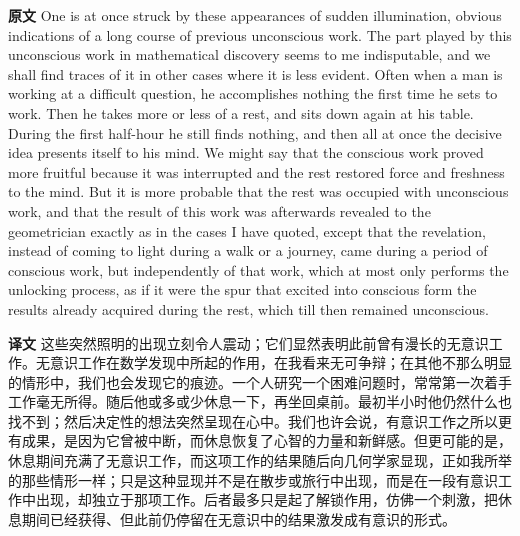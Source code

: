 \documentclass[UTF8]{ctexart}
\newenvironment{english}{\par\small\noindent\textbf{原文}\quad\ignorespaces}{\par}
\newenvironment{zhtranslation}{\par\noindent\textbf{译文}\quad\ignorespaces}{\par\vspace{0.35em}}
\begin{document}
\begin{english}
One is at once struck by these appearances of sudden illumination, obvious indications of a long course of previous unconscious work. The part played by this unconscious work in mathematical discovery seems to me indisputable, and we shall find traces of it in other cases where it is less evident. Often when a man is working at a difficult question, he accomplishes nothing the first time he sets to work. Then he takes more or less of a rest, and sits down again at his table. During the first half-hour he still finds nothing, and then all at once the decisive idea presents itself to his mind. We might say that the conscious work proved more fruitful because it was interrupted and the rest restored force and freshness to the mind. But it is more probable that the rest was occupied with unconscious work, and that the result of this work was afterwards revealed to the geometrician exactly as in the cases I have quoted, except that the revelation, instead of coming to light during a walk or a journey, came during a period of conscious work, but independently of that work, which at most only performs the unlocking process, as if it were the spur that excited into conscious form the results already acquired during the rest, which till then remained unconscious.
\end{english}
\begin{zhtranslation}
这些突然照明的出现立刻令人震动；它们显然表明此前曾有漫长的无意识工作。无意识工作在数学发现中所起的作用，在我看来无可争辩；在其他不那么明显的情形中，我们也会发现它的痕迹。一个人研究一个困难问题时，常常第一次着手工作毫无所得。随后他或多或少休息一下，再坐回桌前。最初半小时他仍然什么也找不到；然后决定性的想法突然呈现在心中。我们也许会说，有意识工作之所以更有成果，是因为它曾被中断，而休息恢复了心智的力量和新鲜感。但更可能的是，休息期间充满了无意识工作，而这项工作的结果随后向几何学家显现，正如我所举的那些情形一样；只是这种显现并不是在散步或旅行中出现，而是在一段有意识工作中出现，却独立于那项工作。后者最多只是起了解锁作用，仿佛一个刺激，把休息期间已经获得、但此前仍停留在无意识中的结果激发成有意识的形式。\end{zhtranslation}
\end{document}
